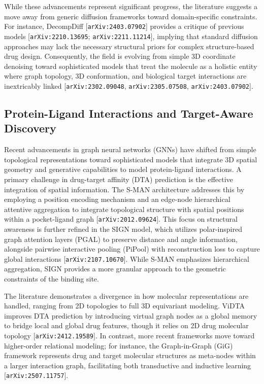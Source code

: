 \documentclass[11pt]{article}
\begin{document}
While these advancements represent significant progress, the literature suggests a move away from generic diffusion frameworks toward domain-specific constraints. For instance, DecompDiff [\texttt{arXiv:2403.07902}] provides a critique of previous models [\texttt{arXiv:2210.13695}; \texttt{arXiv:2211.11214}], implying that standard diffusion approaches may lack the necessary structural priors for complex structure-based drug design. Consequently, the field is evolving from simple 3D coordinate denoising toward sophisticated models that treat the molecule as a holistic entity where graph topology, 3D conformation, and biological target interactions are inextricably linked [\texttt{arXiv:2302.09048}, \texttt{arXiv:2305.07508}, \texttt{arXiv:2403.07902}].

\subsection{Protein-Ligand Interactions and Target-Aware Discovery}

Recent advancements in graph neural networks (GNNs) have shifted from simple topological representations toward sophisticated models that integrate 3D spatial geometry and generative capabilities to model protein-ligand interactions. A primary challenge in drug-target affinity (DTA) prediction is the effective integration of spatial information. The S-MAN architecture addresses this by employing a position encoding mechanism and an edge-node hierarchical attentive aggregation to integrate topological structure with spatial positions within a pocket-ligand graph [\texttt{arXiv:2012.09624}]. This focus on structural awareness is further refined in the SIGN model, which utilizes polar-inspired graph attention layers (PGAL) to preserve distance and angle information, alongside pairwise interactive pooling (PiPool) with reconstruction loss to capture global interactions [\texttt{arXiv:2107.10670}]. While S-MAN emphasizes hierarchical aggregation, SIGN provides a more granular approach to the geometric constraints of the binding site.

The literature demonstrates a divergence in how molecular representations are handled, ranging from 2D topologies to full 3D equivariant modeling. ViDTA improves DTA prediction by introducing virtual graph nodes as a global memory to bridge local and global drug features, though it relies on 2D drug molecular topology [\texttt{arXiv:2412.19589}]. In contrast, more recent frameworks move toward higher-order relational modeling; for instance, the Graph-in-Graph (GiG) framework represents drug and target molecular structures as meta-nodes within a larger interaction graph, facilitating both transductive and inductive learning [\texttt{arXiv:2507.11757}].
\end{document}
